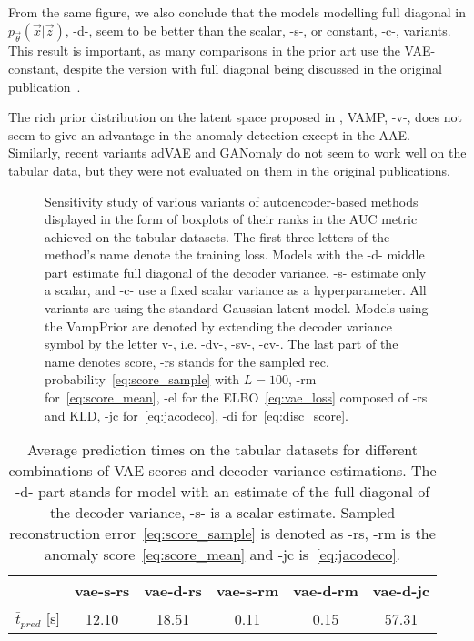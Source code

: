 From the same figure, we also conclude that the models modelling full diagonal in $p_{\vec{\theta}}(\vec{x}|\vec{z})$, -d-, seem to be better than the scalar, -s-, or constant, -c-, variants. This result is important, as many comparisons in the prior art use the VAE-constant, despite the version with full diagonal being discussed in the original publication~\cite{kingma2013auto}.

The rich prior distribution on the latent space proposed in \cite{tomczak2018vae}, VAMP, -v-, does not seem to give an advantage in the anomaly detection except in the AAE. Similarly, recent variants adVAE and GANomaly do not seem to work well on the tabular data, but they were not evaluated on them in the original publications.

\begin{figure}
    \centering
    \small
    
    \caption{Sensitivity study of various variants of  autoencoder-based methods displayed in the form of boxplots of their ranks in the AUC metric achieved on the tabular datasets. The first three letters of the method's name denote the training loss. Models with the -d- middle part estimate full diagonal of the decoder variance, -s- estimate only a scalar, and -c-  use a fixed scalar variance as a hyperparameter. All variants are using the standard Gaussian latent model. Models using the VampPrior are denoted by extending the decoder variance symbol by the letter v-, i.e. -dv-, -sv-, -cv-. The last part of the name denotes score, -rs stands for the sampled rec. probability~\eqref{eq:score_sample} with $L=100$, -rm for~\eqref{eq:score_mean}, -el for the ELBO~\eqref{eq:vae_loss} composed of -rs and KLD, -jc for~\eqref{eq:jacodeco}, -di for~\eqref{eq:disc_score}.}
    \label{fig:tabular_ae_only_box_auc_meanmax}
\end{figure}


\begin{table}
    \footnotesize
    \centering
    \tabcolsep=0.05cm
    \begin{tabular}{c|c c c c c}
         & vae-s-rs & vae-d-rs & vae-s-rm & vae-d-rm & vae-d-jc \\
         \midrule
        $\bar{t}_{pred}$ [s] & 12.10 & 18.51 & 0.11 & 0.15 & 57.31
    \end{tabular}
    \vspace*{0.15cm}
    \caption{Average prediction times on the  tabular datasets for different combinations of VAE scores and decoder variance estimations. The -d- part stands for model with an estimate of the full diagonal of the decoder variance, -s- is a scalar estimate. Sampled reconstruction error~\eqref{eq:score_sample} is denoted as -rs, -rm is the anomaly score~\eqref{eq:score_mean} and -jc is~\eqref{eq:jacodeco}.}
    \label{tab:predict_times}
\end{table}



